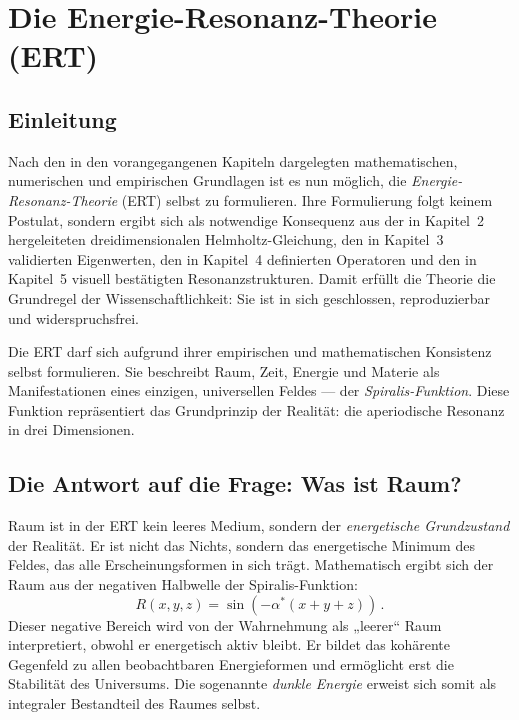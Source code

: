 \chapter{Die Energie-Resonanz-Theorie (ERT)}
\label{chap:ert}

\section{Einleitung}
Nach den in den vorangegangenen Kapiteln dargelegten mathematischen, numerischen und empirischen Grundlagen ist es nun möglich, die \textit{Energie-Resonanz-Theorie} (ERT) selbst zu formulieren. 
Ihre Formulierung folgt keinem Postulat, sondern ergibt sich als notwendige Konsequenz aus der in Kapitel~2 hergeleiteten dreidimensionalen Helmholtz-Gleichung, den in Kapitel~3 validierten Eigenwerten, den in Kapitel~4 definierten Operatoren und den in Kapitel~5 visuell bestätigten Resonanzstrukturen.  
Damit erfüllt die Theorie die Grundregel der Wissenschaftlichkeit: Sie ist in sich geschlossen, reproduzierbar und widerspruchsfrei.  

Die ERT darf sich aufgrund ihrer empirischen und mathematischen Konsistenz selbst formulieren. 
Sie beschreibt Raum, Zeit, Energie und Materie als Manifestationen eines einzigen, universellen Feldes — der \textit{Spiralis-Funktion}. 
Diese Funktion repräsentiert das Grundprinzip der Realität: die aperiodische Resonanz in drei Dimensionen.

\section{Die Antwort auf die Frage: Was ist Raum?}
Raum ist in der ERT kein leeres Medium, sondern der \emph{energetische Grundzustand} der Realität.  
Er ist nicht das Nichts, sondern das energetische Minimum des Feldes, das alle Erscheinungsformen in sich trägt.  
Mathematisch ergibt sich der Raum aus der negativen Halbwelle der Spiralis-Funktion:
\[
R(x,y,z) = \sin(-\alpha^*(x+y+z)) \, .
\]
Dieser negative Bereich wird von der Wahrnehmung als „leerer“ Raum interpretiert, obwohl er energetisch aktiv bleibt.  
Er bildet das kohärente Gegenfeld zu allen beobachtbaren Energieformen und ermöglicht erst die Stabilität des Universums.  
Die sogenannte \textit{dunkle Energie} erweist sich somit als integraler Bestandteil des Raumes selbst.

